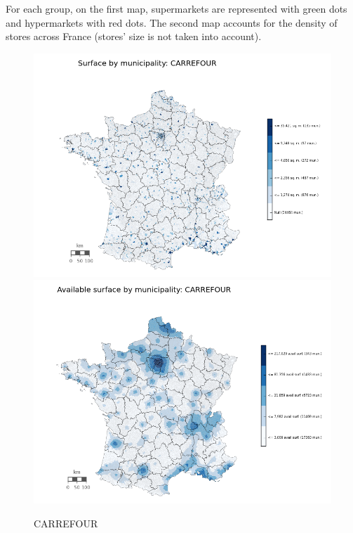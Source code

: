 \documentclass[11pt]{article}
\begin{document}
For each group, on the first map, supermarkets are represented with green dots and hypermarkets with red dots. The second map accounts for the density of stores across France (stores' size is not taken into account).

\begin{figure}[H]
    \caption{CARREFOUR}
	\centering
		\includegraphics[width=15cm]{images/maps_surface/CARREFOUR.png}
        \includegraphics[width=15cm]{images/maps_available_surface/CARREFOUR.png}
\end{figure}
\end{document}
